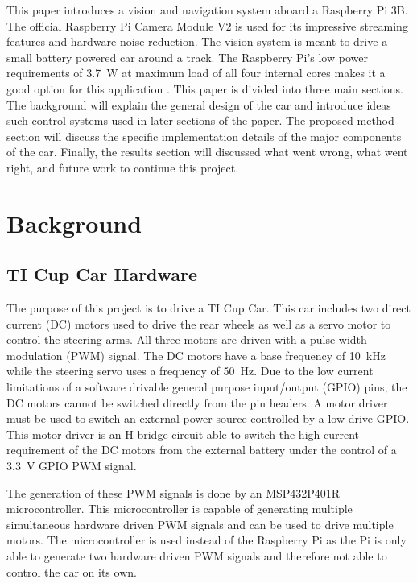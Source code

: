 \documentclass{article}
\begin{document}
This paper introduces a vision and navigation system aboard a Raspberry Pi 3B. The official Raspberry Pi Camera Module V2 is used for its impressive streaming features and hardware noise reduction. The vision system is meant to drive a small battery powered car around a track. The Raspberry Pi's low power requirements of \SI{3.7}{\watt} at maximum load of all four internal cores makes it a good option for this application \cite{b2}. This paper is divided into three main sections. The background will explain the general design of the car and introduce ideas such control systems used in later sections of the paper. The proposed method section will discuss the specific implementation details of the major components of the car. Finally, the results section will discussed what went wrong, what went right, and future work to continue this project.

\section{Background}

\subsection{TI Cup Car Hardware}

The purpose of this project is to drive a TI Cup Car. This car includes two direct current (DC) motors used to drive the rear wheels as well as a servo motor to control the steering arms. All three motors are driven with a pulse-width modulation (PWM) signal. The DC motors have a base frequency of \SI{10}{\kilo\hertz} while the steering servo uses a frequency of \SI{50}{\hertz}. Due to the low current limitations of a software drivable general purpose input/output (GPIO) pins, the DC motors cannot be switched directly from the pin headers. A motor driver must be used to switch an external power source controlled by a low drive GPIO. This motor driver is an H-bridge circuit able to switch the high current requirement of the DC motors from the external battery under the control of a \SI{3.3}{\volt} GPIO PWM signal.

The generation of these PWM signals is done by an MSP432P401R microcontroller. This microcontroller is capable of generating multiple simultaneous hardware driven PWM signals and can be used to drive multiple motors. The microcontroller is used instead of the Raspberry Pi as the Pi is only able to generate two hardware driven PWM signals and therefore not able to control the car on its own.
\end{document}
